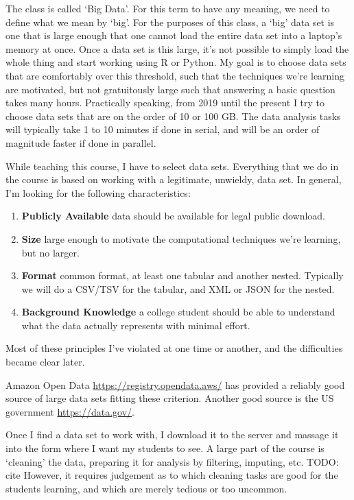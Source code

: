 \documentclass{article}
\begin{document}

The class is called `Big Data'.
For this term to have any meaning, we need to define what we mean by `big'.
For the purposes of this class, a `big' data set is one that is large enough that one cannot load the entire data set into a laptop's memory at once.
Once a data set is this large, it's not possible to simply load the whole thing and start working using R or Python.
My goal is to choose data sets that are comfortably over this threshold, such that the techniques we're learning are motivated, but not gratuitously large such that answering a basic question takes many hours.
Practically speaking, from 2019 until the present I try to choose data sets that are on the order of 10 or 100 GB.
The data analysis tasks will typically take 1 to 10 minutes if done in serial, and will be an order of magnitude faster if done in parallel.

While teaching this course, I have to select data sets.
Everything that we do in the course is based on working with a legitimate, unwieldy, data set.
In general, I'm looking for the following characteristics:
\begin{enumerate}
\item \textbf{Publicly Available} data should be available for legal public download.
\item \textbf{Size} large enough to motivate the computational techniques we're learning, but no larger.
\item \textbf{Format} common format, at least one tabular and another nested. Typically we will do a CSV/TSV for the tabular, and XML or JSON for the nested.
\item \textbf{Background Knowledge} a college student should be able to understand what the data actually represents with minimal effort.
\end{enumerate}

Most of these principles I've violated at one time or another, and the difficulties became clear later.

Amazon Open Data \url{https://registry.opendata.aws/} has provided a reliably good source of large data sets fitting these criterion. 
Another good source is the US government \url{https://data.gov/}.

Once I find a data set to work with, I download it to the server and massage it into the form where I want my students to see.
A large part of the course is `cleaning' the data, preparing it for analysis by filtering, imputing, etc.
TODO: cite
However, it requires judgement as to which cleaning tasks are good for the students learning, and which are merely tedious or too uncommon.
\end{document}
